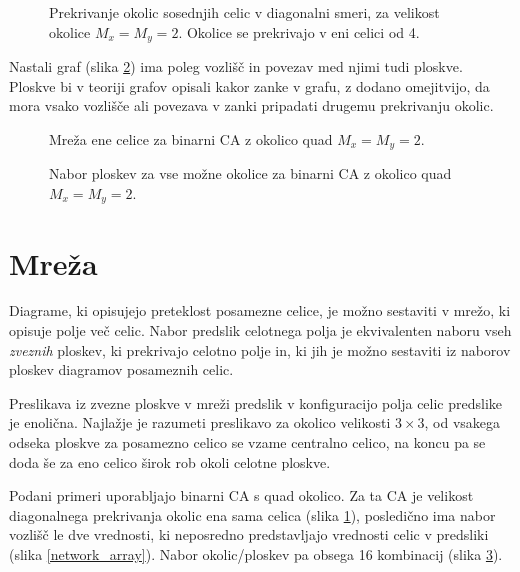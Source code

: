 \documentclass[12pt,a4paper,openany,twoside]{book}
\begin{document}
\begin{figure}[htb]
\centerline{}
\caption[Prekrivanje okolic \(2 \times 2\) - diagonalno.]
{Prekrivanje okolic sosednjih celic v diagonalni smeri, za velikost okolice \(M_x=M_y=2\).
Okolice se prekrivajo v eni celici od 4.}
\label{overlap_diagonal_quad}
\end{figure}

Nastali graf (slika \ref{network_single}) ima poleg vozlišč in povezav med njimi tudi ploskve.
Ploskve bi v teoriji grafov opisali kakor zanke v grafu, z dodano omejitvijo,
da mora vsako vozlišče ali povezava v zanki pripadati drugemu prekrivanju okolic.

\begin{figure}[htb]
\centerline{}
\caption[Mreža ene celice.]{Mreža ene celice za binarni CA z okolico quad \(M_x=M_y=2\).}
\label{network_single}
\end{figure}

\begin{figure}[htb]
\centerline{}
\caption[Nabor ploskev.]{Nabor ploskev za vse možne okolice za binarni CA z okolico quad \(M_x=M_y=2\).}
\label{neighborhood_surfaces}
\end{figure}

\section{Mreža}

Diagrame, ki opisujejo preteklost posamezne celice, je možno sestaviti v mrežo,
ki opisuje polje več celic. Nabor predslik celotnega polja je ekvivalenten naboru
vseh \textit{zveznih} ploskev, ki prekrivajo celotno polje in, ki jih je možno sestaviti iz
naborov ploskev diagramov posameznih celic.

Preslikava iz zvezne ploskve v mreži predslik v konfiguracijo polja celic predslike je enolična.
Najlažje je razumeti preslikavo za okolico velikosti \(3 \times 3\),
od vsakega odseka ploskve za posamezno celico se vzame centralno celico,
na koncu pa se doda še za eno celico širok rob okoli celotne ploskve.

Podani primeri uporabljajo binarni CA s quad okolico.
Za ta CA je velikost diagonalnega prekrivanja okolic ena sama celica (slika \ref{overlap_diagonal_quad}),
posledično ima nabor vozlišč le dve vrednosti, ki neposredno predstavljajo
vrednosti celic v predsliki (slika \ref{network_array}).
Nabor okolic/ploskev pa obsega 16 kombinacij (slika \ref{neighborhood_surfaces}).
\end{document}
